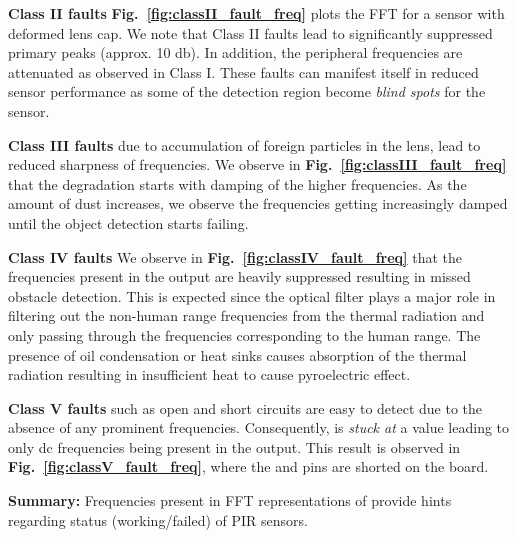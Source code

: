 \textbf{Class II faults} %
\textbf{Fig.~\ref{fig:classII_fault_freq}} plots the FFT for a sensor with deformed lens cap. 
We note that Class II faults lead to significantly suppressed primary peaks (approx. 10 db). In addition, the peripheral frequencies are attenuated as observed in Class I. These faults can manifest itself in reduced sensor performance as some of the detection region become \textit{blind spots} for the sensor.

\textbf{Class III faults} due to accumulation of foreign particles in the lens, lead to reduced sharpness of frequencies.
We observe in \textbf{Fig.~\ref{fig:classIII_fault_freq}} that the degradation starts with damping of the higher frequencies. As the amount of dust increases, we observe the frequencies getting increasingly damped until the object detection starts failing.

\textbf{Class IV faults}
We observe in \textbf{Fig.~\ref{fig:classIV_fault_freq}} that the frequencies present in the output are heavily suppressed resulting in missed obstacle detection. This is expected since the optical filter plays a major role in filtering out the non-human range frequencies from the thermal radiation and only passing through the frequencies corresponding to the human range. The presence of oil condensation or heat sinks causes absorption of the thermal radiation resulting in insufficient heat to cause pyroelectric effect. 

\textbf{Class V faults} such as open and short circuits are %
easy to detect due to the absence of any prominent frequencies. Consequently, \aout is \textit{stuck at} a value leading to only dc frequencies being present in the output. This result is observed in {\bfseries Fig.~\ref{fig:classV_fault_freq}}, where the \cout and \aout pins are shorted on the board. 

\noindent \textbf{Summary:} %
Frequencies present in FFT representations of \aout provide hints regarding status (\ie working/failed) of PIR sensors.





